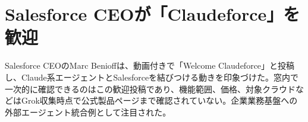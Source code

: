 \section{Salesforce CEOが「Claudeforce」を歓迎}
Salesforce CEOのMarc Benioffは、動画付きで「Welcome Claudeforce」と投稿し、Claude系エージェントとSalesforceを結びつける動きを印象づけた。窓内で一次的に確認できるのはこの歓迎投稿であり、機能範囲、価格、対象クラウドなどはGrok収集時点で公式製品ページまで確認されていない。企業業務基盤への外部エージェント統合例として注目された。
